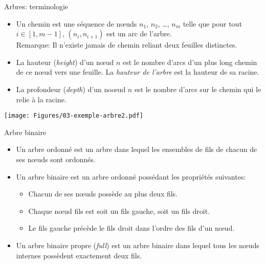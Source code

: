 \begin{frame}{Arbres: terminologie}

\begin{itemize}
\item Un \alert{chemin} est une séquence de n\oe uds $n_1$, $n_2$, \ldots, $n_m$ telle que pour tout $i\in [1,m-1]$, $(n_i,n_{i+1})$ est un arc de l'arbre.\\
Remarque: Il n'existe jamais de chemin reliant deux feuilles distinctes.
\item La \alert{hauteur} (\emph{height}) d'un n\oe ud $n$ est le nombre d'arcs d'un plus long chemin de ce n\oe ud vers une feuille. La \emph{hauteur de l'arbre} est la hauteur de sa racine.
\item La \alert{profondeur} (\emph{depth}) d'un no\oe ud $n$ est le nombre d'arcs sur le chemin qui le relie à la racine.
\end{itemize}

\centerline{\texttt{[image: Figures/03-exemple-arbre2.pdf]}}

\end{frame}

\begin{frame}{Arbre binaire}

\begin{itemize}
\item Un arbre \alert{ordonné} est un arbre dans lequel les ensembles de fils de chacun de ses n\oe uds sont ordonnés.
\item Un arbre \alert{binaire} est un arbre ordonné possédant les propriétés suivantes:
\begin{itemize}
\item Chacun de ses n\oe uds possède au plus deux fils.
\item Chaque n\oe ud fils est soit un fils gauche, soit un fils droit.
\item Le fils gauche précède le fils droit dans l'ordre des fils d'un n\oe ud.
\end{itemize}
\item Un arbre \alert{binaire propre} (\emph{full}) est un arbre binaire dans lequel tous les n\oe uds internes possèdent exactement deux fils.
\end{itemize}

\end{frame}

